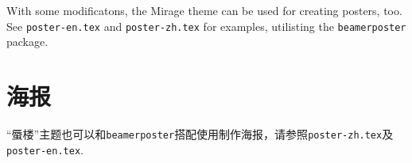 \documentclass{article}
\begin{document}
\begin{paracol}{2}
With some modificatons, the Mirage theme can be used for creating posters, too. See \texttt{poster-en.tex} and \texttt{poster-zh.tex} for examples, utilisting the \texttt{beamerposter} package.

\switchcolumn

\section{海报}

“蜃楼”主题也可以和\texttt{beamerposter}搭配使用制作海报，请参照\texttt{poster-zh.tex}及\texttt{poster-en.tex}.

\switchcolumn*

\begin{center}
\end{center}

\switchcolumn


\end{paracol}
\end{document}
